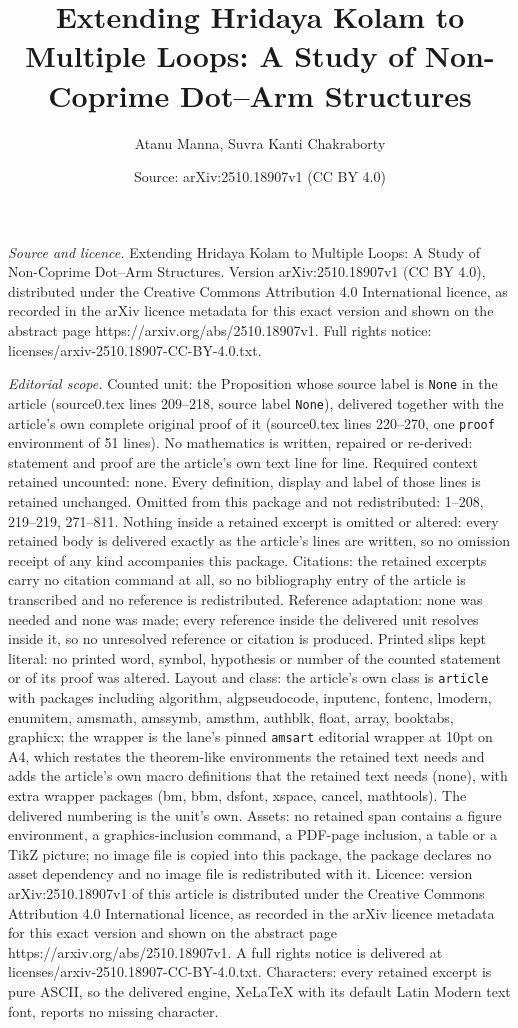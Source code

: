 \documentclass[10pt,a4paper]{amsart}
\title[Extending Hridaya Kolam to Multiple Loops: A Study of Non-Co]{Extending Hridaya Kolam to Multiple Loops: A Study of Non-Coprime Dot--Arm Structures}
\author{Atanu Manna, Suvra Kanti Chakraborty}
\date{Source: arXiv:2510.18907v1 (CC BY 4.0)}
\begin{document}
\maketitle

\noindent\emph{Source and licence.} Extending Hridaya Kolam to Multiple Loops: A Study of Non-Coprime Dot--Arm Structures. Version arXiv:2510.18907v1 (CC BY 4.0), distributed under the Creative Commons Attribution 4.0 International licence, as recorded in the arXiv licence metadata for this exact version and shown on the abstract page https://arxiv.org/abs/2510.18907v1. Full rights notice: licenses/arxiv-2510.18907-CC-BY-4.0.txt.\par\smallskip

\noindent\textit{Editorial scope.} Counted unit: the Proposition whose source label is \texttt{None} in the article (source0.tex lines 209--218, source label \texttt{None}), delivered together with the article's own complete original proof of it (source0.tex lines 220--270, one \texttt{proof} environment of 51 lines). No mathematics is written, repaired or re-derived: statement and proof are the article's own text line for line. Required context retained uncounted: none. Every definition, display and label of those lines is retained unchanged. Omitted from this package and not redistributed: 1--208, 219--219, 271--811. Nothing inside a retained excerpt is omitted or altered: every retained body is delivered exactly as the article's lines are written, so no omission receipt of any kind accompanies this package. Citations: the retained excerpts carry no citation command at all, so no bibliography entry of the article is transcribed and no reference is redistributed. Reference adaptation: none was needed and none was made; every reference inside the delivered unit resolves inside it, so no unresolved reference or citation is produced. Printed slips kept literal: no printed word, symbol, hypothesis or number of the counted statement or of its proof was altered. Layout and class: the article's own class is \texttt{article} with packages including algorithm, algpseudocode, inputenc, fontenc, lmodern, enumitem, amsmath, amssymb, amsthm, authblk, float, array, booktabs, graphicx; the wrapper is the lane's pinned \texttt{amsart} editorial wrapper at 10pt on A4, which restates the theorem-like environments the retained text needs and adds the article's own macro definitions that the retained text needs (none), with extra wrapper packages (bm, bbm, dsfont, xspace, cancel, mathtools). The delivered numbering is the unit's own. Assets: no retained span contains a figure environment, a graphics-inclusion command, a PDF-page inclusion, a table or a TikZ picture; no image file is copied into this package, the package declares no asset dependency and no image file is redistributed with it. Licence: version arXiv:2510.18907v1 of this article is distributed under the Creative Commons Attribution 4.0 International licence, as recorded in the arXiv licence metadata for this exact version and shown on the abstract page https://arxiv.org/abs/2510.18907v1. A full rights notice is delivered at licenses/arxiv-2510.18907-CC-BY-4.0.txt. Characters: every retained excerpt is pure ASCII, so the delivered engine, XeLaTeX with its default Latin Modern text font, reports no missing character.
\end{document}
